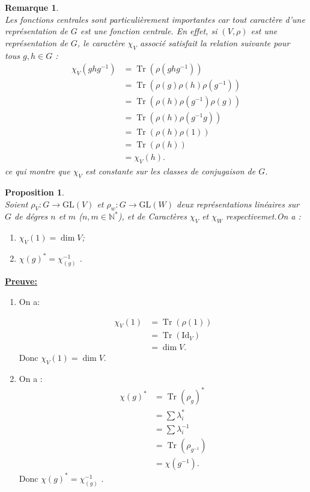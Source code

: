 \documentclass[a4paper, 14pt]{report}
\newtheorem{remark}{Remarque}[section]
\newtheorem{proposition}{Proposition}[section]
\begin{document}
\begin{onehalfspace}
{\begin{remark} \cite{renard2009groupes}\\
Les fonctions centrales sont particulièrement importantes car tout caractère d'une représentation de $G$ est une fonction centrale. En effet, si $(V, \rho)$ est une représentation de $G$, le caractère $\chi_V$ associé satisfait la relation suivante pour tous $g, h \in G$ :
	\begin{align*}
		\chi_V(ghg^{-1}) &= \operatorname{Tr}(\rho(ghg^{-1})) \\
		&= \operatorname{Tr}(\rho(g) \rho(h)\rho(g^{-1})) \\ 
		&= \operatorname{Tr}(\rho(h)\rho(g^{-1}) \rho(g) ) \\ 
		&= \operatorname{Tr}(\rho(h)\rho(g^{-1}g)) \\
		&= \operatorname{Tr}(\rho(h)\rho(1)) \\
		&= \operatorname{Tr}(\rho(h)) \\
		&= \chi_V(h).
	\end{align*}
ce qui montre que $\chi_V$ est constante sur les classes de conjugaison de $G$.
\end{remark}


\newpage

\begin{proposition} \cite{serre1971representation} \\
Soient \( \rho_V : G \rightarrow \mathrm{GL}(V) \) et \( \rho_w : G \rightarrow \mathrm{GL}(W) \) deux représentations linéaires sur \(G\) de dégres \(n\) et \(m\) (\(n,m \in \mathbb{N^*}\)), et de Caractères \( \chi_V \) et \(\chi_W \)  respectivemet.On a :
	\begin{enumerate}[label=\roman*)]
		\item \( \chi_V(1) = \dim V \);
		\item \( \chi{(g)^*} = {\chi_{(g)}^{-1}} \) \quad {}. 
	\end{enumerate}
\end{proposition}


\textbf{\underline{Preuve:}} 
\begin{enumerate}[label=\roman*)]
	\item On a:
	
	\[
	\begin{aligned}
		\chi_V(1) &= \operatorname{Tr}(\rho(1)) \\
		&= \operatorname{Tr}(\mathrm{Id}_V) \\
		&= \dim V.
	\end{aligned}
	\]
	Donc \( \chi_V(1) = \dim V \).
	\item On a :
	\begin{align*}
		\chi(g)^* &= \operatorname{Tr}(\rho_g)^* \\
		&= \sum \lambda_i^* \\
		&= \sum \lambda_i^{-1} \\
		&= \operatorname{Tr}(\rho_{g^{-1}}) \\
		&= \chi(g^{-1}).
	\end{align*}
	Donc \( \chi{(g)^*} = {\chi_(g)^{-1}} \) \quad {}.	
\end{enumerate}


}
\end{onehalfspace}
\end{document}
